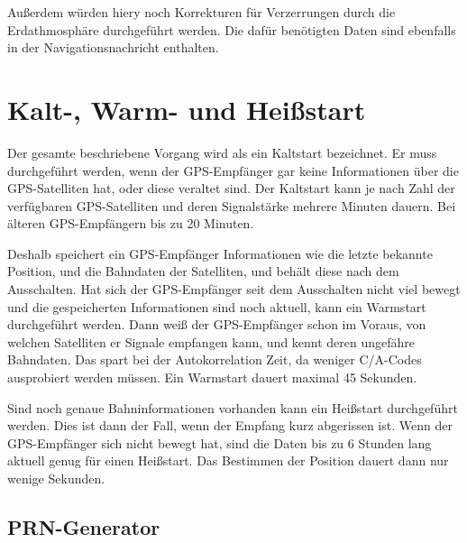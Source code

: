 \documentclass[12pt,a4paper]{scrartcl}
\begin{document}
Außerdem würden hiery noch Korrekturen für Verzerrungen durch die Erdathmosphäre durchgeführt werden. Die dafür benötigten Daten sind ebenfalls in der Navigationsnachricht enthalten.

\section{Kalt-, Warm- und Heißstart}
Der gesamte beschriebene Vorgang wird als ein Kaltstart bezeichnet. Er muss durchgeführt werden, wenn der GPS-Empfänger gar keine Informationen über die GPS-Satelliten hat, oder diese veraltet sind. Der Kaltstart kann je nach Zahl der verfügbaren GPS-Satelliten und deren Signalstärke mehrere Minuten dauern. Bei älteren GPS-Empfängern bis zu 20 Minuten.

Deshalb speichert ein GPS-Empfänger Informationen wie die letzte bekannte Position, und die Bahndaten der Satelliten, und behält diese nach dem Ausschalten. Hat sich der GPS-Empfänger seit dem Ausschalten nicht viel bewegt und die gespeicherten Informationen sind noch aktuell, kann ein Warmstart durchgeführt werden. Dann weiß der GPS-Empfänger schon im Voraus, von welchen Satelliten er Signale empfangen kann, und kennt deren ungefähre Bahndaten. Das spart bei der Autokorrelation Zeit, da weniger C/A-Codes ausprobiert werden müssen. Ein Warmstart dauert maximal 45 Sekunden.

Sind noch genaue Bahninformationen vorhanden kann ein Heißstart durchgeführt werden. Dies ist dann der Fall, wenn der Empfang kurz abgerissen ist. Wenn der GPS-Empfänger sich nicht bewegt hat, sind die Daten bis zu 6 Stunden lang aktuell genug für einen Heißstart. Das Bestimmen der Position dauert dann nur wenige Sekunden.

\newpage
\printbibliography
\newpage

\begin{appendix}
\section{PRN-Generator}
\end{appendix}
\end{document}
